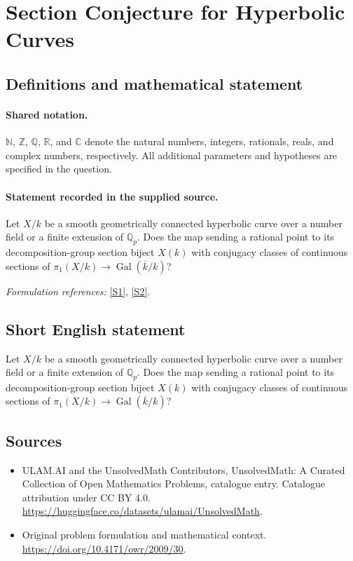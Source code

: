 \documentclass[11pt]{article}
\newcommand{\sref}[2]{\hyperlink{source:#1:#2}{[S#2]}}
\begin{document}
\section{Section Conjecture for Hyperbolic Curves}\label{statement}

\subsection{Definitions and mathematical statement}

\paragraph{Shared notation.}$\mathbb N$, $\mathbb Z$, $\mathbb Q$, $\mathbb R$, and $\mathbb C$ denote the natural numbers, integers, rationals, reals, and complex numbers, respectively. All additional parameters and hypotheses are specified in the question.


\paragraph{Statement recorded in the supplied source.}
Let $X/k$ be a smooth geometrically connected hyperbolic curve over a number field or a finite extension of $\mathbb Q_p$. Does the map sending a rational point to its decomposition-group section biject $X(k)$ with conjugacy classes of continuous sections of $\pi_1(X/k)\to\operatorname{Gal}(\overline k/k)$?
\par\smallskip\textit{Formulation references:} \sref{statement}{1}, \sref{statement}{2}.
\subsection{Short English statement}
Let $X/k$ be a smooth geometrically connected hyperbolic curve over a number field or a finite extension of $\mathbb Q_p$. Does the map sending a rational point to its decomposition-group section biject $X(k)$ with conjugacy classes of continuous sections of $\pi_1(X/k)\to\operatorname{Gal}(\overline k/k)$?
\subsection{Sources}
\begin{itemize}
\item[\hypertarget{source:statement:1}{S1}] ULAM.AI and the UnsolvedMath Contributors, UnsolvedMath: A Curated Collection of Open Mathematics Problems, catalogue entry. Catalogue attribution under CC BY 4.0.
\url{https://huggingface.co/datasets/ulamai/UnsolvedMath}.
\item[\hypertarget{source:statement:2}{S2}] Original problem formulation and mathematical context.
\url{https://doi.org/10.4171/owr/2009/30}.
\end{itemize}
\label{end:statement}
\end{document}
